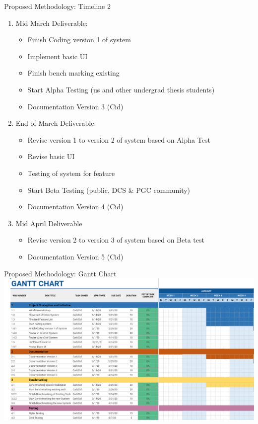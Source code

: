 \documentclass{beamer}
\begin{document}
    \begin{frame}{Proposed Methodology: Timeline 2}
        \begin{enumerate}  
        \item Mid March Deliverable:
            \begin{itemize}
                \item Finish Coding version 1 of system
                \item Implement basic UI
                \item Finish bench marking existing 
                \item Start Alpha Testing (us and other undergrad thesis students)
                \item Documentation Version 3 (Cid)
            \end{itemize}
        \item End of March Deliverable:
            \begin{itemize}
                \item Revise version 1 to version 2 of system based on Alpha Test
                \item Revise basic UI
                \item Testing of system for feature 
                \item Start Beta Testing (public, DCS \& PGC community)
                \item Documentation Version 4 (Cid)
            \end{itemize}
        \item Mid April Deliverable
            \begin{itemize}
                \item Revise version 2 to version 3 of system based on Beta test
                \item Documentation Version 5 (Cid)
            \end{itemize}
    \end{enumerate}
\end{frame}


    \begin{frame}{Proposed Methodology: Gantt Chart}
        \centering
        \includegraphics[scale=1]{jan.png}
    \end{frame}
    
\end{document}
